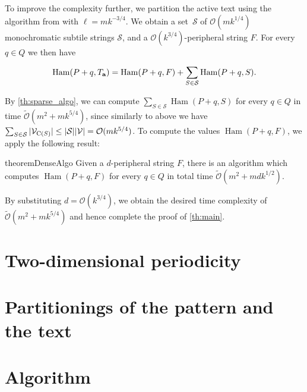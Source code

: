 \documentclass[11pt, letterpaper]{article}
\theoremstyle{plain}
\theoremstyle{definition}
\theoremstyle{remark}
\renewcommand{\O}{\mathcal{O}}
\newcommand{\tO}{\tilde{\mathcal{O}}}
\renewcommand{\S}{\mathcal{S}}
\newcommand{\V}{\mathcal{V}}
\DeclareMathOperator*{\Ham}{Ham}
\begin{document}
To improve the complexity further, we partition the active text using the algorithm from  with $\ell = mk^{-3/4}$.
We obtain a set~$\S$ of $\O(mk^{1/4})$ monochromatic subtile strings $\S$, and a $\O(k^{3 / 4})$-peripheral string $F$. For every $q \in Q$ we then have

\[ \Ham(P + q, \Ta) = \Ham(P + q, F) + \sum_{S \in \S} \Ham(P + q, S).\]

By \cref{th:sparse_algo}, we can compute $\sum_{S \in \S} \Ham(P + q, S)$ for every $q \in Q$ in time $\tO(m^2 + mk^{5/4})$, since similarly to above we have $\sum_{S \in \S} |\V_{\getchar{S}}| \le |\S| |\V| = \O(mk^{5/4})$. To compute the values $\Ham(P + q, F)$, we apply the following result:

\begin{restatable*}{theorem}{DenseAlgo}
\label{th:dense_algo}
Given a $d$-peripheral string $F$, there is an algorithm which computes $\Ham(P + q, F)$ for every $q \in Q$ in total time $\tO(m^2 + mdk^{1/2})$.
\end{restatable*}

By substituting $d = \O(k^{3/4})$, we obtain the desired time complexity of $\tO(m^2 + mk^{5/4})$ and hence complete the proof of \cref{th:main}.

\section{Two-dimensional periodicity}

\section{Partitionings of the pattern and the text}

\section{Algorithm}
\end{document}
